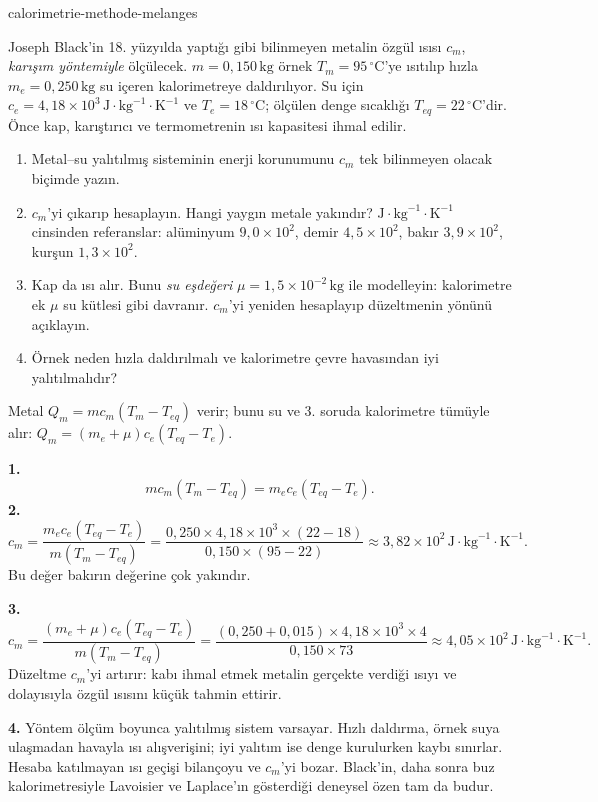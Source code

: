 \begin{exo}{calorimetrie-methode-melanges}

Joseph Black'in 18. yüzyılda yaptığı gibi bilinmeyen metalin özgül ısısı $c_m$, \emph{karışım yöntemiyle} ölçülecek. $m=0{,}150\,\text{kg}$ örnek $T_m=95\,^\circ\text{C}$'ye ısıtılıp hızla $m_e=0{,}250\,\text{kg}$ su içeren kalorimetreye daldırılıyor. Su için $c_e=4{,}18\times10^3\,\text{J}\!\cdot\!\text{kg}^{-1}\!\cdot\!\text{K}^{-1}$ ve $T_e=18\,^\circ\text{C}$; ölçülen denge sıcaklığı $T_{eq}=22\,^\circ\text{C}$'dir. Önce kap, karıştırıcı ve termometrenin ısı kapasitesi ihmal edilir.
\begin{enumerate}
  \item Metal–su yalıtılmış sisteminin enerji korunumunu $c_m$ tek bilinmeyen olacak biçimde yazın.
  \item $c_m$'yi çıkarıp hesaplayın. Hangi yaygın metale yakındır? $\text{J}\!\cdot\!\text{kg}^{-1}\!\cdot\!\text{K}^{-1}$ cinsinden referanslar: alüminyum $9{,}0\times10^2$, demir $4{,}5\times10^2$, bakır $3{,}9\times10^2$, kurşun $1{,}3\times10^2$.
  \item Kap da ısı alır. Bunu \emph{su eşdeğeri} $\mu=1{,}5\times10^{-2}\,\text{kg}$ ile modelleyin: kalorimetre ek $\mu$ su kütlesi gibi davranır. $c_m$'yi yeniden hesaplayıp düzeltmenin yönünü açıklayın.
  \item Örnek neden hızla daldırılmalı ve kalorimetre çevre havasından iyi yalıtılmalıdır?
\end{enumerate}
\begin{indication}
Metal $Q_m=mc_m(T_m-T_{eq})$ verir; bunu su ve 3. soruda kalorimetre tümüyle alır: $Q_m=(m_e+\mu)c_e(T_{eq}-T_e)$.
\end{indication}
\begin{solution}
\textbf{1.}
\[
mc_m(T_m-T_{eq})=m_ec_e(T_{eq}-T_e).
\]
\textbf{2.}
\[
c_m=\frac{m_ec_e(T_{eq}-T_e)}{m(T_m-T_{eq})}
=\frac{0{,}250\times4{,}18\times10^3\times(22-18)}{0{,}150\times(95-22)}
\approx3{,}82\times10^2\,\text{J}\!\cdot\!\text{kg}^{-1}\!\cdot\!\text{K}^{-1}.
\]
Bu değer bakırın değerine çok yakındır.

\textbf{3.}
\[
c_m=\frac{(m_e+\mu)c_e(T_{eq}-T_e)}{m(T_m-T_{eq})}
=\frac{(0{,}250+0{,}015)\times4{,}18\times10^3\times4}{0{,}150\times73}
\approx4{,}05\times10^2\,\text{J}\!\cdot\!\text{kg}^{-1}\!\cdot\!\text{K}^{-1}.
\]
Düzeltme $c_m$'yi artırır: kabı ihmal etmek metalin gerçekte verdiği ısıyı ve dolayısıyla özgül ısısını küçük tahmin ettirir.

\textbf{4.} Yöntem ölçüm boyunca yalıtılmış sistem varsayar. Hızlı daldırma, örnek suya ulaşmadan havayla ısı alışverişini; iyi yalıtım ise denge kurulurken kaybı sınırlar. Hesaba katılmayan ısı geçişi bilançoyu ve $c_m$'yi bozar. Black'in, daha sonra buz kalorimetresiyle Lavoisier ve Laplace'ın gösterdiği deneysel özen tam da budur.
\end{solution}
\end{exo}

